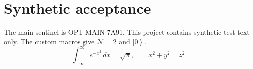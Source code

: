 \documentclass{article}
\newcommand{\cN}{\mathcal{N}}
\newcommand{\ket}[1]{\left|#1\right\rangle}
\begin{document}
\section{Synthetic acceptance}
The main sentinel is OPT-MAIN-7A91.
This project contains synthetic test text only.
The custom macros give $\cN=2$ and $\ket{0}$.
\begin{equation}
\int_{-\infty}^{\infty} e^{-x^2}\,dx=\sqrt{\pi},
\qquad x^2+y^2=z^2.
\end{equation}

\end{document}

